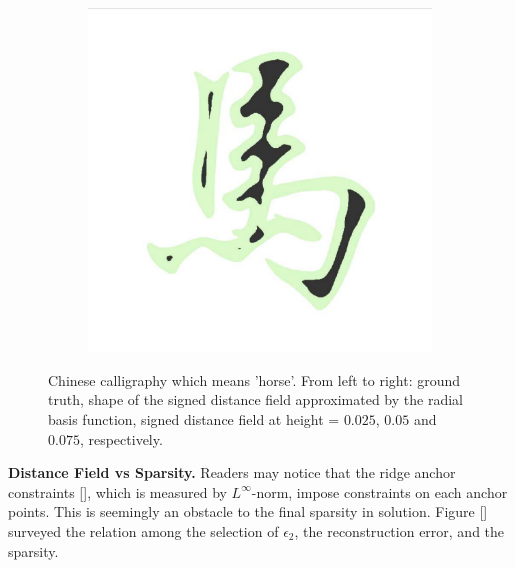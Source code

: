 \documentclass[annual]{acmsiggraph}
\begin{document}
\begin{figure}
\begin{subfigure}[b]{0.18\linewidth}
        \end{subfigure}
~
		\begin{subfigure}[b]{0.18\linewidth}
                \centering
                \includegraphics[width=\textwidth]{images/horse/horse-contour-0d75.pdf}
        \end{subfigure}
        \caption{Chinese calligraphy which means 'horse'. From left to right: ground truth, shape of the signed distance field approximated by the radial basis function, signed distance field at height = $0.025$, $0.05$ and $0.075$, respectively. }
				\label{fig:horse}
\end{figure}

\textbf{Distance Field vs Sparsity. }
Readers may notice that the ridge anchor constraints [], which is measured by $L^{\infty}$-norm, impose constraints on each anchor points. This is seemingly an obstacle to the final sparsity in solution. Figure [] surveyed the relation among the selection of $\epsilon_2$, the reconstruction error, and the sparsity. 
\end{document}
